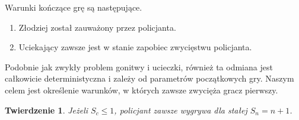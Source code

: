 \documentclass[brudnopis]{xmgr}
\newtheorem{Twierdzenie}{Twierdzenie}
\theoremstyle{definition}
\begin{document}
\noindent Warunki kończące grę są następujące.
\begin{enumerate}
  \item Złodziej został zauważony przez policjanta.
  \item Uciekający zawsze jest w stanie zapobiec zwycięstwu policjanta.
\end{enumerate}

Podobnie jak zwykły problem gonitwy i ucieczki, również ta odmiana jest całkowicie deterministyczna i zależy od parametrów początkowych gry. Naszym celem jest określenie warunków, w których zawsze zwycięża gracz pierwszy. 

\begin{Twierdzenie} \cite{poscig}
	Jeżeli $S_c \le 1$, policjant zawsze wygrywa dla stałej $S_n = n + 1$.
\end{Twierdzenie}
\end{document}
